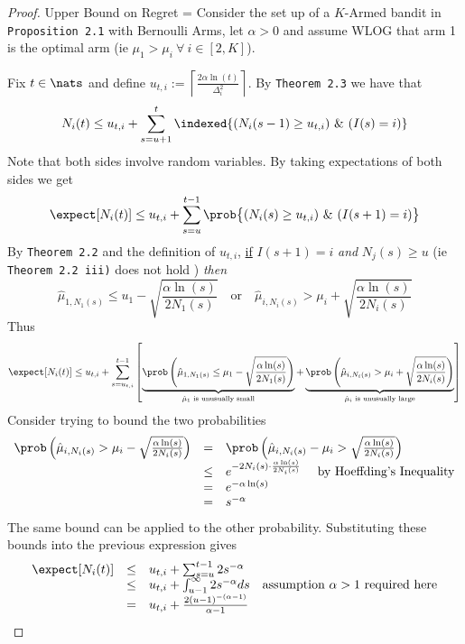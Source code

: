 \documentclass[11pt,a4paper]{article}
\begin{document}
  \begin{proof}{Upper Bound on Regret}
    \everymath={\displaystyle}
    Consider the set up of a $K$-Armed bandit in \texttt{Proposition 2.1} with Bernoulli Arms, let $\alpha>0$ and assume WLOG that arm 1 is the optimal arm (ie $\mu_1>\mu_i\ \forall\ i\in[2,K]$).
    \par Fix $t\in\nats$ and define $u_{t,i}:=\left\lceil\frac{2\alpha\ln(t)}{\Delta_i^2}\right\rceil$.
    By \texttt{Theorem 2.3} we have that
    \[ N_i(t)\leq u_{t,i}+\sum_{s=u+1}^t\indexed\{(N_i(s-1)\geq u_{t,i})\ \&\ (I(s)=i)\} \]
    Note that both sides involve random variables. By taking expectations of both sides we get
    \[ \expect[N_i(t)]\leq u_{t,i}+\sum_{s=u}^{t-1}\prob\big\{(N_i(s)\geq u_{t,i})\ \&\ (I(s+1)=i)\big\} \]
    By \texttt{Theorem 2.2} and the definition of $u_{t,i}$, \underline{if} $I(s+1)=i$\textit{ and }$N_j(s)\geq u$ (ie \texttt{Theorem 2.2 iii)} does not hold )\textit{ then}
    \[ \hat\mu_{1,N_1(s)}\leq u_1-\sqrt{\frac{\alpha\ln(s)}{2N_1(s)}}\quad\text{or}\quad\hat\mu_{i,N_i(s)}>\mu_i+\sqrt{\frac{\alpha\ln(s)}{2N_i(s)}} \]
    Thus
    \[ \expect[N_i(t)]\leq u_{t,i}+\sum_{s=u_{t,i}}^{t-1}\left[\underbrace{\prob\left(\hat\mu_{1,N_1(s)}\leq\mu_1-\sqrt{\frac{\alpha\ln(s)}{2N_1(s)}}\right)}_{\tiny\text{$\hat\mu_1$ is unusually small}}+\underbrace{\prob\left(\hat\mu_{i,N_i(s)}>\mu_i+\sqrt{\frac{\alpha\ln(s)}{2N_i(s)}}\right)}_{\tiny\text{$\hat\mu_i$ is unusually large}}\right] \]
    Consider trying to bound the two probabilities
    \[\begin{array}{rcl}
      \prob\left(\hat\mu_{i,N_i(s)}>\mu_i-\sqrt{\frac{\alpha\ln(s)}{2N_i(s)}}\right)&=&\prob\left(\hat\mu_{i,N_i(s)}-\mu_i>\sqrt{\frac{\alpha\ln(s)}{2N_i(s)}}\right)\\
      &\leq&e^{-2N_i(s)\cdot\frac{\alpha\ln(s)}{2N_i(s)}}\quad\text{ by Hoeffding's Inequality}\\
      &=&e^{-\alpha\ln(s)}\\
      &=&s^{-\alpha}\\
    \end{array}\]
    The same bound can be applied to the other probability. Substituting these bounds into the previous expression gives
    \[\begin{array}{rcl}
    \expect[N_i(t)]&\leq& u_{t,i}+\sum_{s=u}^{t-1}2s^{-\alpha}\\
    &\leq&u_{t,i}+\int_{u-1}^\infty2s^{-\alpha}ds\quad\text{assumption $\alpha>1$ required here}\\
    &=&u_{t,i}+\frac{2(u-1)^{-(\alpha-1)}}{\alpha-1}\\

\end{array}\]
\end{proof}
\end{document}
